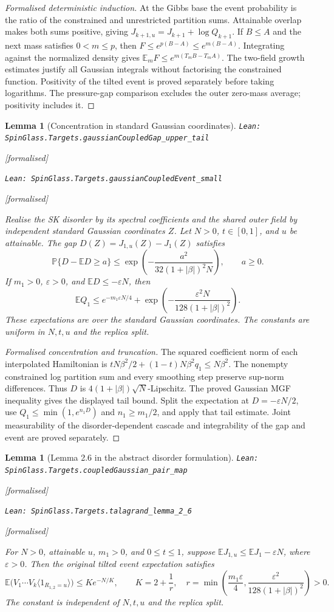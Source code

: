 \documentclass[11pt]{article}
\providecommand{\lean}[1]{\leavevmode\par\nopagebreak
  {\noindent\normalfont\footnotesize\raggedright\texttt{Lean: #1}\par}\nopagebreak}
\providecommand{\leanok}{\par\nopagebreak
  {\noindent\normalfont\footnotesize\textcolor{green!50!black}{[formalised]}\par}\nopagebreak}
\newtheorem{lemma}[theorem]{Lemma}
\newcommand{\E}{\mathbb{E}}
\begin{document}
\begin{proof}[Formalised deterministic induction]
At the Gibbs base the event probability is the ratio of the constrained and
unrestricted partition sums. Attainable overlap makes both sums positive,
giving $J_{k+1,u}=J_{k+1}+\log Q_{k+1}$.
If $B\le A$ and the next mass satisfies $0<m\le p$, then
$F\le e^{p(B-A)}\le e^{m(B-A)}$.
Integrating against the normalized density gives
$\mathbb E_m F\le e^{m(T_mB-T_mA)}$.
The two-field growth estimates justify all Gaussian integrals without
factorising the constrained function. Positivity of the tilted event is proved
separately before taking logarithms. The pressure-gap comparison excludes the
outer zero-mass average; positivity includes it.
\end{proof}

\begin{lemma}[Concentration in standard Gaussian coordinates]
\lean{SpinGlass.Targets.gaussianCoupledGap\_upper\_tail}\leanok
\lean{SpinGlass.Targets.gaussianCoupledEvent\_small}\leanok
Realise the SK disorder by its spectral coefficients and the shared outer field
by independent standard Gaussian coordinates $Z$. Let $N>0$, $t\in[0,1]$, and
$u$ be attainable. The gap $D(Z)=J_{1,u}(Z)-J_1(Z)$ satisfies
\[
\mathbb P\{D-\E D\ge a\}
\le \exp\!\left(-\frac{a^2}{32(1+|\beta|)^2N}\right),\qquad a\ge0.
\]
If $m_1>0$, $\varepsilon>0$, and $\E D\le-\varepsilon N$, then
\[
\E Q_1\le e^{-m_1\varepsilon N/4}
+\exp\!\left(-\frac{\varepsilon^2N}{128(1+|\beta|)^2}\right).
\]
These expectations are over the standard Gaussian coordinates. The constants
are uniform in $N,t,u$ and the replica split.
\end{lemma}

\begin{proof}[Formalised concentration and truncation]
The squared coefficient norm of each interpolated Hamiltonian is
$tN\beta^2/2+(1-t)N\beta^2q_1\le N\beta^2$.
The nonempty constrained log partition sum and every smoothing step preserve
sup-norm differences. Thus $D$ is $4(1+|\beta|)\sqrt N$-Lipschitz.
The proved Gaussian MGF inequality gives the displayed tail bound.
Split the expectation at $D=-\varepsilon N/2$, use
$Q_1\le\min(1,e^{n_1D})$ and $n_1\ge m_1/2$, and apply that tail estimate.
Joint measurability of the disorder-dependent cascade and integrability of
the gap and event are proved separately.
\end{proof}

\begin{lemma}[Lemma 2.6 in the abstract disorder formulation]
\lean{SpinGlass.Targets.coupledGaussian\_pair\_map}\leanok
\lean{SpinGlass.Targets.talagrand\_lemma\_2\_6}\leanok
For $N>0$, attainable $u$, $m_1>0$, and $0\le t\le1$, suppose
$\E J_{1,u}\le\E J_1-\varepsilon N$, where $\varepsilon>0$.
Then the original tilted event expectation satisfies
\[
\E\bigl(V_1\cdots V_k\langle1_{R_{1,2}=u}\rangle\bigr)
\le K e^{-N/K},\qquad
K=2+\frac1r,\quad
r=\min\left(\frac{m_1\varepsilon}{4},
\frac{\varepsilon^2}{128(1+|\beta|)^2}\right)>0.
\]
The constant is independent of $N,t,u$ and the replica split.
\end{lemma}
\end{document}
